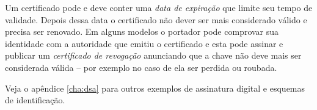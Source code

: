 Um certificado pode e deve conter uma {\em data de expiração} que limite seu tempo de validade.
Depois dessa data o certificado não dever ser mais considerado válido e precisa ser renovado.
Em alguns modelos o portador pode comprovar sua identidade com a autoridade que emitiu o certificado e esta pode assinar e publicar um {\em certificado de revogação} anunciando que a chave não deve mais ser considerada válida -- por exemplo no caso de ela ser perdida ou roubada.

Veja o apêndice \ref{cha:dsa} para outros exemplos de assinatura digital e esquemas de identificação.





